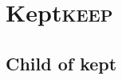 \documentclass[11pt]{article}
\date{\today}
\title{}
\begin{document}
\tableofcontents

\section{Kept\hfill{}\textsc{keep}}
\label{sec:org1c59b52}
\subsection{Child of kept}
\label{sec:org7bfd295}
\end{document}
